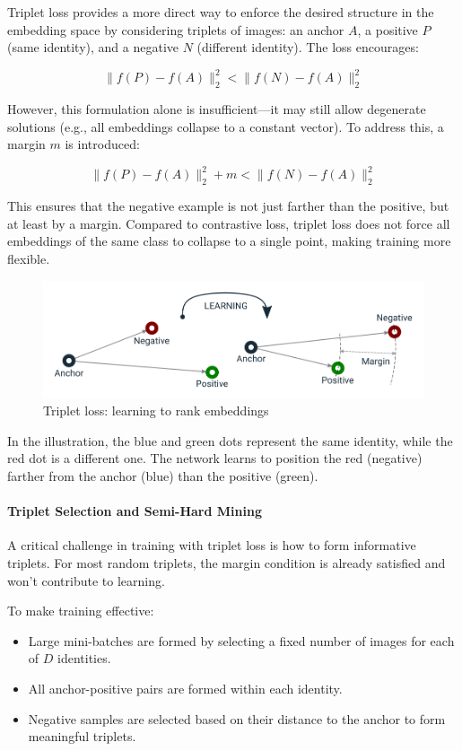 Triplet loss provides a more direct way to enforce the desired structure in the embedding space by considering triplets of images: an anchor $A$, a positive $P$ (same identity), and a negative $N$ (different identity). The loss encourages:

$$\| f(P) - f(A) \|_2^2 < \| f(N) - f(A) \|_2^2$$

However, this formulation alone is insufficient—it may still allow degenerate solutions (e.g., all embeddings collapse to a constant vector). To address this, a margin $m$ is introduced:

$$\| f(P) - f(A) \|_2^2 + m < \| f(N) - f(A) \|_2^2$$

This ensures that the negative example is not just farther than the positive, but at least by a margin. Compared to contrastive loss, triplet loss does not force all embeddings of the same class to collapse to a single point, making training more flexible.

\begin{figure}[htbp]
  \centering
  \includegraphics[width=0.7\linewidth]{./img/triplet_loss.png}
  \caption{Triplet loss: learning to rank embeddings}
\end{figure}

In the illustration, the blue and green dots represent the same identity, while the red dot is a different one. The network learns to position the red (negative) farther from the anchor (blue) than the positive (green).

\paragraph{Triplet Selection and Semi-Hard Mining}

A critical challenge in training with triplet loss is how to form informative triplets. For most random triplets, the margin condition is already satisfied and won't contribute to learning.

To make training effective:
\begin{itemize}
  \item Large mini-batches are formed by selecting a fixed number of images for each of $D$ identities.
  \item All anchor-positive pairs are formed within each identity.
  \item Negative samples are selected based on their distance to the anchor to form meaningful triplets.
\end{itemize}


